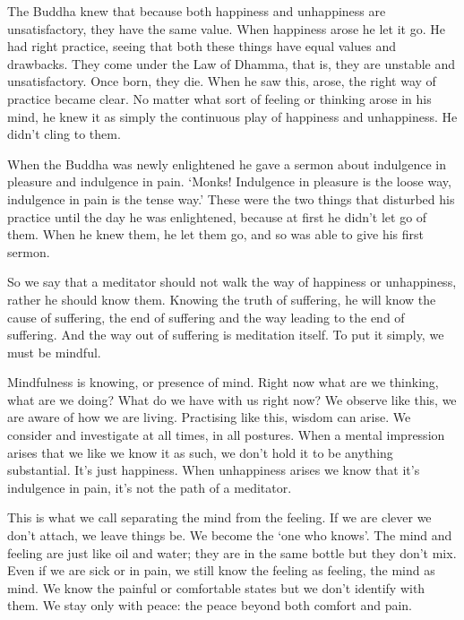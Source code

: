 The Buddha knew that because both happiness and unhappiness are unsatisfactory, they have the same value. When happiness arose he let it go. He had right practice, seeing that both these things have equal values and drawbacks. They come under the Law of Dhamma, that is, they are unstable and unsatisfactory. Once born, they die. When he saw this,  arose, the right way of practice became clear. No matter what sort of feeling or thinking arose in his mind, he knew it as simply the continuous play of happiness and unhappiness. He didn't cling to them.

When the Buddha was newly enlightened he gave a sermon about indulgence in pleasure and indulgence in pain. `Monks! Indulgence in pleasure is the loose way, indulgence in pain is the tense way.' These were the two things that disturbed his practice until the day he was enlightened, because at first he didn't let go of them. When he knew them, he let them go, and so was able to give his first sermon.

So we say that a meditator should not walk the way of happiness or unhappiness, rather he should know them. Knowing the truth of suffering, he will know the cause of suffering, the end of suffering and the way leading to the end of suffering. And the way out of suffering is meditation itself. To put it simply, we must be mindful.

Mindfulness is knowing, or presence of mind. Right now what are we thinking, what are we doing? What do we have with us right now? We observe like this, we are aware of how we are living. Practising like this, wisdom can arise. We consider and investigate at all times, in all postures. When a mental impression arises that we like we know it as such, we don't hold it to be anything substantial. It's just happiness. When unhappiness arises we know that it's indulgence in pain, it's not the path of a meditator.

This is what we call separating the mind from the feeling. If we are clever we don't attach, we leave things be. We become the `one who knows'. The mind and feeling are just like oil and water; they are in the same bottle but they don't mix. Even if we are sick or in pain, we still know the feeling as feeling, the mind as mind. We know the painful or comfortable states but we don't identify with them. We stay only with peace: the peace beyond both comfort and pain.

